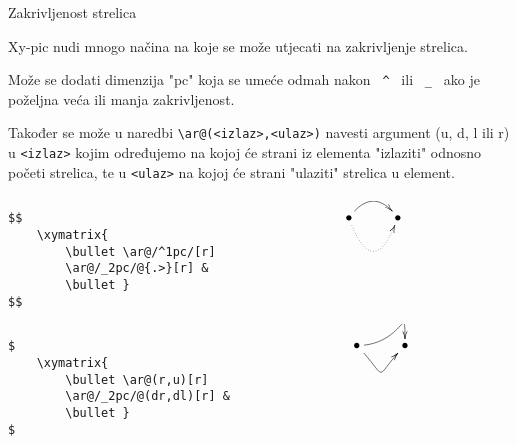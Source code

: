 \begin{frame}{Zakrivljenost strelica}

Xy-pic nudi mnogo načina na koje se može utjecati na zakrivljenje strelica.\newline

Može se dodati dimenzija "pc" koja se umeće odmah nakon \verb| ^ | ili \verb| _ | ako je poželjna veća ili manja zakrivljenost.\newpage

Također se može u naredbi \verb|\ar@(<izlaz>,<ulaz>)| navesti argument (u, d, l ili r) u \verb|<izlaz>| kojim određujemo na kojoj će strani iz elementa "izlaziti" odnosno početi strelica, te u \verb|<ulaz>| na kojoj će strani "ulaziti" strelica u element. 

\begin{columns}[c]

\begin{column}{0.5\textwidth}

\begin{Verbatim}[fontsize=\tiny]
$$
    \xymatrix{
        \bullet \ar@/^1pc/[r]
        \ar@/_2pc/@{.>}[r] &
        \bullet }
$$

\end{Verbatim}

\end{column}

\begin{column}{0.5\textwidth}%

$    
    \xymatrix{
        \bullet \ar@/^1pc/[r]
        \ar@/_2pc/@{.>}[r] &
        \bullet }      
$
 
\end{column}

\end{columns}

\begin{columns}[c]

\begin{column}{0.5\textwidth}

\begin{Verbatim}[fontsize=\tiny]
$
    \xymatrix{
        \bullet \ar@(r,u)[r]
        \ar@/_2pc/@(dr,dl)[r] &
        \bullet }
$

\end{Verbatim}

\end{column}

\begin{column}{0.5\textwidth}%

$
    \xymatrix{
        \bullet \ar@(r,u)[r]
        \ar@/_2pc/@(dr,dl)[r] &
        \bullet }
$
 
\end{column}

\end{columns}

\end{frame}
